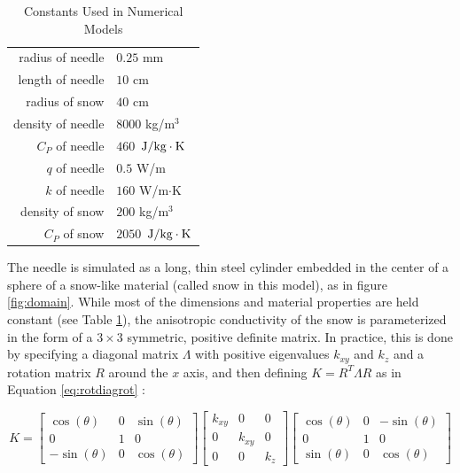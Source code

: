 \begin{table}[h]
\label{tab:constants}
\centering
\caption{Constants Used in Numerical Models}
\begin{tabular}{r | l}
radius of needle & \(0.25\) mm\\
length of needle & \(10\) cm\\
radius of snow & \(40\) cm\\
\hline
density of needle & \(8000\) kg/\(\textrm{m}^3\)\\
\(C_P\) of needle & \(460\) \(\left.{\textrm{J}}\middle/{\textrm{kg}\cdot\textrm{K}}\right.\) \\
\(q\) of needle & \(0.5\) W/m\\
\(k\) of needle & \(160\) W/m\(\cdot\)K\\
\hline
density of snow & \(200\) kg/\(\textrm{m}^3\)\\
\(C_P\) of snow & \(2050\)  \(\left.{\textrm{J}}\middle/{\textrm{kg}\cdot\textrm{K}}\right.\)
\end{tabular}
\end{table}

The needle is simulated as a long, thin steel cylinder embedded in the center
of a sphere of a snow-like material (called snow in this model), as in figure \ref{fig:domain}. While most of the dimensions
and material properties are held constant (see Table \ref{tab:constants}), the
anisotropic conductivity of the snow is parameterized in the form
of a  \(3\times3\) symmetric, positive definite matrix.  In practice, this is
done by specifying a diagonal matrix \(\Lambda\) with positive eigenvalues
\(k_{xy}\) and \(k_z\) and a rotation matrix \(R\) around the \(x\) axis, and
then defining \(K = R^T\Lambda R\) as in Equation \ref{eq:rotdiagrot} :

\begin{equation}
\label{eq:rotdiagrot}
K = \begin{bmatrix}
\cos(\theta) & 0 & \sin(\theta)\\
0 & 1 & 0\\
-\sin(\theta) & 0 &\cos(\theta)
\end{bmatrix}
\begin{bmatrix}
k_{xy} & 0 & 0\\
0 & k_{xy} & 0\\
0 & 0 & k_z
\end{bmatrix}
\begin{bmatrix}
\cos(\theta) & 0 & -\sin(\theta)\\
0 & 1 & 0\\
\sin(\theta) & 0 &\cos(\theta)
\end{bmatrix}
\end{equation}

